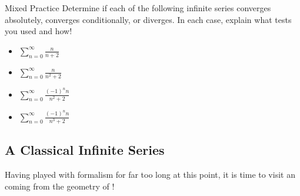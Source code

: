 \begin{exercise}{Mixed Practice \Coffeecup \Coffeecup \Coffeecup}
Determine if each of the following infinite series converges absolutely, converges conditionally, or diverges.  In each case, explain what tests you used and how!

\begin{itemize}

\item $\sum_{n=0}^{\infty} \frac{n}{n+2} $

\vspace*{1.5in}

\item $\sum_{n=0}^{\infty} \frac{n}{n^2+2}$

\vspace*{1.5in}

\item $\sum_{n=0}^{\infty} \frac{(-1)^nn}{n^2+2}$

\vspace*{1.5in}

\item $\sum_{n=0}^{\infty} \frac{(-1)^nn}{n^3+2}$

\vspace*{1.5in}

\end{itemize} 
\end{exercise}

\subsection{A Classical Infinite Series}

Having played with formalism for far too long at this point, it is time to visit an  coming from the geometry of !  

